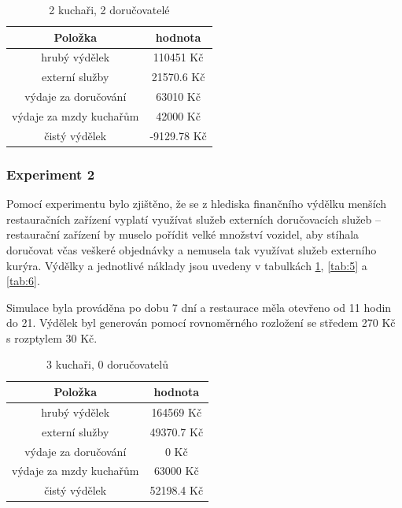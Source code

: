 \documentclass[a4paper, 11pt]{article}
\begin{document}
\begin{table}[h]
\centering
\begin{tabular}{cc}
\textbf{Položka} & \textbf{hodnota}                                                                                   \\ \hline
hrubý výdělek & 110451 Kč \\ \hline
externí služby  & 21570.6 Kč \\ \hline
výdaje za doručování &  63010 Kč \\ \hline
výdaje za mzdy kuchařům &  42000 Kč \\ \hline
čistý výdělek &  -9129.78 Kč \\ \hline
\end{tabular}
\caption{2 kuchaři, 2 doručovatelé}
\end{table}

\newpage

\subsubsection{Experiment 2}
Pomocí experimentu bylo zjištěno, že se z hlediska finančního výdělku menších restauračních zařízení vyplatí využívat služeb externích doručovacích služeb -- restaurační zařízení by muselo pořídit velké množství vozidel, aby stíhala doručovat včas veškeré objednávky a nemusela tak využívat služeb externího kurýra. Výdělky a jednotlivé náklady jsou uvedeny v tabulkách \ref{tab:4}, \ref{tab:5} a \ref{tab:6}. 

Simulace byla prováděna po dobu 7 dní a restaurace měla otevřeno od 11 hodin do 21. Výdělek byl generován pomocí rovnoměrného rozložení se středem 270 Kč s rozptylem 30 Kč. 

\begin{table}[h]
\centering
\begin{tabular}{cc}
\textbf{Položka} & \textbf{hodnota}                                                                                   \\ \hline
hrubý výdělek & 164569 Kč \\ \hline
externí služby  & 49370.7 Kč \\ \hline
výdaje za doručování &  0 Kč \\ \hline
výdaje za mzdy kuchařům &  63000 Kč \\ \hline
čistý výdělek &  52198.4 Kč
\end{tabular}
\caption{3 kuchaři, 0 doručovatelů}
\label{tab:4}
\end{table}
\end{document}
